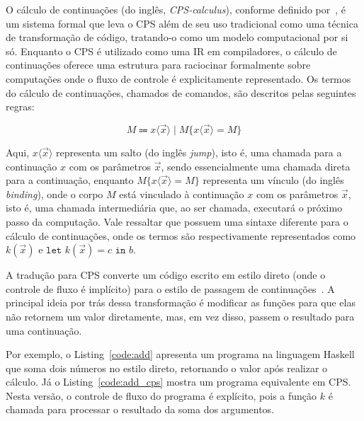 O cálculo de continuações (do inglês, \textit{CPS-calculus}), conforme definido por~, é um sistema formal que leva o CPS além de seu uso tradicional como uma técnica de transformação de código, tratando-o como um modelo computacional por si só.
Enquanto o CPS é utilizado como uma IR em compiladores, o cálculo de continuações oferece uma estrutura para raciocinar formalmente sobre computações onde o fluxo de controle é explicitamente representado.
Os termos do cálculo de continuações, chamados de comandos, são descritos pelas seguintes regras:

\begin{equation}
  M \Coloneqq x\langle \vec{x} \rangle \mid M\{x\langle \vec{x} \rangle = M\}
\end{equation}

Aqui, $x\langle \vec{x} \rangle$ representa um salto (do inglês \textit{jump}), isto é, uma chamada para a continuação $x$ com os parâmetros $\vec{x}$, sendo essencialmente uma chamada direta para a continuação, enquanto $M\{x\langle \vec{x} \rangle = M\}$ representa um vínculo (do inglês \textit{binding}), onde o corpo $M$ está vinculado à continuação $x$ com os parâmetros $\vec{x}$, isto é, uma chamada intermediária que, ao ser chamada, executará o próximo passo da computação.
Vale ressaltar que  possuem uma sintaxe diferente para o cálculo de continuações, onde os termos são respectivamente representados como $k(\vec{x})$ e $\texttt{let }k(\vec{x}) = c \texttt{ in } b$.

A tradução para CPS converte um código escrito em estilo direto (onde o controle de fluxo é implícito) para o estilo de passagem de continuações~\cite{flanagan1993essence}.
A principal ideia por trás dessa transformação é modificar as funções para que elas não retornem um valor diretamente, mas, em vez disso, passem o resultado para uma continuação.





Por exemplo, o Listing~\ref{code:add} apresenta um programa na linguagem Haskell que soma dois números no estilo direto, retornando o valor após realizar o cálculo.
Já o Listing~\ref{code:add_cps} mostra um programa equivalente em CPS\@.
Nesta versão, o controle de fluxo do programa é explícito, pois a função $k$ é chamada para processar o resultado da soma dos argumentos.

